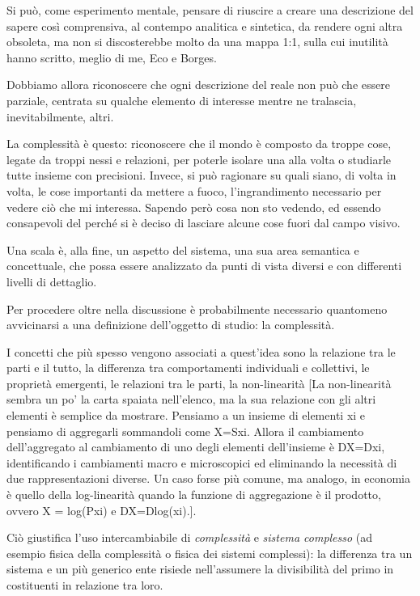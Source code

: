 \documentclass[a4paper, headings=standardclasses]{scrartcl}
\begin{document}
Si può, come esperimento mentale, pensare di riuscire a creare una descrizione del sapere così comprensiva, al contempo analitica e sintetica, da rendere ogni altra obsoleta, ma non si discosterebbe molto da una mappa 1:1, sulla cui inutilità hanno scritto, meglio di me, Eco e Borges.

Dobbiamo allora riconoscere che ogni descrizione del reale non può che essere parziale, centrata su qualche elemento di interesse mentre ne tralascia, inevitabilmente, altri.

La complessità è questo: riconoscere che il mondo è composto da troppe cose, legate da troppi nessi e relazioni, per poterle isolare una alla volta o studiarle tutte insieme con precisioni. Invece, si può ragionare su quali siano, di volta in volta, le cose importanti da mettere a fuoco, l'ingrandimento necessario per vedere ciò che mi interessa. Sapendo però cosa non sto vedendo, ed essendo consapevoli del perché si è deciso di lasciare alcune cose fuori dal campo visivo.

Una scala è, alla fine, un aspetto del sistema, una sua area semantica e concettuale, che possa essere analizzato da punti di vista diversi e con differenti livelli di dettaglio.


Per procedere oltre nella discussione è probabilmente necessario quantomeno avvicinarsi a una definizione dell'oggetto di studio: la complessità.

I concetti che più spesso vengono associati a quest'idea sono la relazione tra le parti e il tutto, la differenza tra comportamenti individuali e collettivi, le proprietà emergenti, le relazioni tra le parti, la non-linearità [La non-linearità sembra un po' la carta spaiata nell'elenco, ma la sua relazione con gli altri elementi è semplice da mostrare. Pensiamo a un insieme di elementi xi e pensiamo di aggregarli sommandoli come X=Sxi. Allora il cambiamento dell'aggregato al cambiamento di uno degli elementi dell'insieme è DX=Dxi, identificando i cambiamenti macro e microscopici ed eliminando la necessità di due rappresentazioni diverse. Un caso forse più comune, ma analogo, in economia è quello della log-linearità quando la funzione di aggregazione è il prodotto, ovvero X = log(Pxi) e DX=Dlog(xi).].

Ciò giustifica l'uso intercambiabile di \textit{complessità} e \textit{sistema complesso} (ad esempio fisica della complessità o fisica dei sistemi complessi): la differenza tra un sistema e un più generico ente risiede nell'assumere la divisibilità del primo in costituenti in relazione tra loro. 
\end{document}
